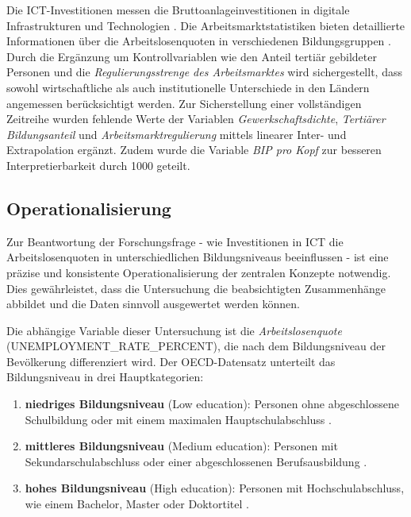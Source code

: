 Die \ac{ICT}-Investitionen messen die Bruttoanlageinvestitionen in digitale Infrastrukturen 
und Technologien \parencite{oecd2022ict}. Die Arbeitsmarktstatistiken bieten detaillierte 
Informationen über die Arbeitslosenquoten in verschiedenen Bildungsgruppen 
\parencite{oecd2022unemployment}. Durch die Ergänzung um Kontrollvariablen wie den Anteil 
tertiär gebildeter Personen und die \textit{Regulierungsstrenge des Arbeitsmarktes} wird 
sichergestellt, dass sowohl wirtschaftliche als auch institutionelle Unterschiede in den 
Ländern angemessen berücksichtigt werden. Zur Sicherstellung einer vollständigen Zeitreihe 
wurden fehlende Werte der Variablen \textit{Gewerkschaftsdichte}, 
\textit{Tertiärer Bildungsanteil} und \textit{Arbeitsmarktregulierung} mittels linearer 
Inter- und Extrapolation ergänzt. Zudem wurde die Variable \textit{\ac{BIP} pro Kopf} zur 
besseren Interpretierbarkeit durch 1000 geteilt.


\subsection{Operationalisierung}

Zur Beantwortung der Forschungsfrage - wie Investitionen in \ac{ICT} die Arbeitslosenquoten 
in unterschiedlichen Bildungsniveaus beeinflussen - ist eine präzise und konsistente 
Operationalisierung der zentralen Konzepte notwendig. Dies gewährleistet, dass die 
Untersuchung die beabsichtigten Zusammenhänge abbildet und die Daten sinnvoll ausgewertet 
werden können.

Die abhängige Variable dieser Untersuchung ist die \textit{Arbeitslosenquote} 
(UNEMPLOYMENT\_RATE\_PERCENT), die nach dem Bildungsniveau der Bevölkerung differenziert 
wird. Der \ac{OECD}-Datensatz unterteilt das Bildungsniveau in drei Hauptkategorien:

\begin{enumerate}

    \item \textbf{niedriges Bildungsniveau} (Low education): Personen ohne abgeschlossene 
    Schulbildung oder mit einem maximalen Hauptschulabschluss \parencite{oecd2022unemployment}.

    \item \textbf{mittleres Bildungsniveau} (Medium education): Personen mit 
    Sekundarschulabschluss oder einer abgeschlossenen Berufsausbildung 
    \parencite{oecd2022unemployment}.

    \item \textbf{hohes Bildungsniveau} (High education): Personen mit Hochschulabschluss, wie 
    einem Bachelor, Master oder Doktortitel \parencite{oecd2022unemployment}.

\end{enumerate}

